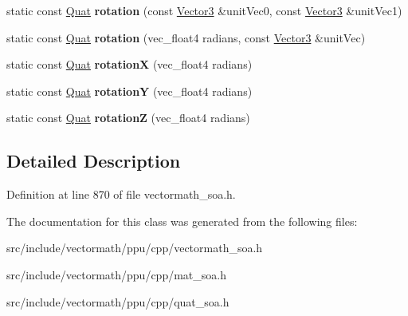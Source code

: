 \begin{DoxyCompactItemize}
\item 
\hypertarget{classVectormath_1_1Soa_1_1Quat_a3437e85a4c40601102bdae8f73159965}{static const \hyperlink{classVectormath_1_1Soa_1_1Quat}{Quat} {\bfseries rotation} (const \hyperlink{classVectormath_1_1Soa_1_1Vector3}{Vector3} \&unit\-Vec0, const \hyperlink{classVectormath_1_1Soa_1_1Vector3}{Vector3} \&unit\-Vec1)}\label{classVectormath_1_1Soa_1_1Quat_a3437e85a4c40601102bdae8f73159965}

\item 
\hypertarget{classVectormath_1_1Soa_1_1Quat_a56e962cc98f5a2ed9c129b1fc876b2d1}{static const \hyperlink{classVectormath_1_1Soa_1_1Quat}{Quat} {\bfseries rotation} (vec\-\_\-float4 radians, const \hyperlink{classVectormath_1_1Soa_1_1Vector3}{Vector3} \&unit\-Vec)}\label{classVectormath_1_1Soa_1_1Quat_a56e962cc98f5a2ed9c129b1fc876b2d1}

\item 
\hypertarget{classVectormath_1_1Soa_1_1Quat_a469add1b599a1b2c99a7073a9ea321b7}{static const \hyperlink{classVectormath_1_1Soa_1_1Quat}{Quat} {\bfseries rotation\-X} (vec\-\_\-float4 radians)}\label{classVectormath_1_1Soa_1_1Quat_a469add1b599a1b2c99a7073a9ea321b7}

\item 
\hypertarget{classVectormath_1_1Soa_1_1Quat_ade5d5cecdb33936bd7d28894f4c1be06}{static const \hyperlink{classVectormath_1_1Soa_1_1Quat}{Quat} {\bfseries rotation\-Y} (vec\-\_\-float4 radians)}\label{classVectormath_1_1Soa_1_1Quat_ade5d5cecdb33936bd7d28894f4c1be06}

\item 
\hypertarget{classVectormath_1_1Soa_1_1Quat_adfe89f097049930668c4009e241d9121}{static const \hyperlink{classVectormath_1_1Soa_1_1Quat}{Quat} {\bfseries rotation\-Z} (vec\-\_\-float4 radians)}\label{classVectormath_1_1Soa_1_1Quat_adfe89f097049930668c4009e241d9121}

\end{DoxyCompactItemize}


\subsection{Detailed Description}


Definition at line 870 of file vectormath\-\_\-soa.\-h.



The documentation for this class was generated from the following files\-:\begin{DoxyCompactItemize}
\item 
src/include/vectormath/ppu/cpp/vectormath\-\_\-soa.\-h\item 
src/include/vectormath/ppu/cpp/mat\-\_\-soa.\-h\item 
src/include/vectormath/ppu/cpp/quat\-\_\-soa.\-h\end{DoxyCompactItemize}
